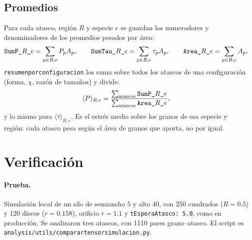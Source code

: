 \documentclass[11pt,a4paper]{article}
\newcommand{\codeus}{\textunderscore\allowbreak}
\newcommand{\code}[1]{\texttt{\begingroup\let\_\codeus#1\endgroup}}
\newcommand{\ave}[1]{\langle #1 \rangle}
\begin{document}
\subsection{Promedios}

Para cada atasco, región $R$ y especie $e$ se guardan los numeradores y
denominadores de los promedios pesados por área:
\begin{equation}
  \code{SumP\_}R\code{\_}e = \sum_{p\in R,e} P_p A_p, \qquad
  \code{SumTau\_}R\code{\_}e = \sum_{p\in R,e} \tau_p A_p, \qquad
  \code{Area\_}R\code{\_}e = \sum_{p\in R,e} A_p .
\end{equation}
\code{resumen\_por\_configuracion} los suma sobre todos los atascos de una
configuración (forma, $\chi$, razón de tamaños) y divide:
\begin{equation}
  \ave{P}_{R,e} = \frac{\sum_\text{atascos}\code{SumP\_}R\code{\_}e}
                       {\sum_\text{atascos}\code{Area\_}R\code{\_}e},
\end{equation}
y lo mismo para $\ave{\tau}_{R,e}$. Es el estrés medio sobre los granos
de esa especie y región: cada atasco pesa según el área de granos que
aporta, no por igual.

\section{Verificación}
\label{sec:verif}

\paragraph{Prueba.} Simulación local de un silo de semiancho 5 y alto
40, con 250 cuadrados ($R = 0.5$) y 120 discos ($r = 0.158$), orificio
$r = 1.1$ y \code{tEsperaAtasco: 5.0}, como en producción. Se analizaron
tres atascos, con 1110 pares grano--atasco. El script es
\code{analysis/utils/comparar\_tensor\_simulacion.py}.
\end{document}
